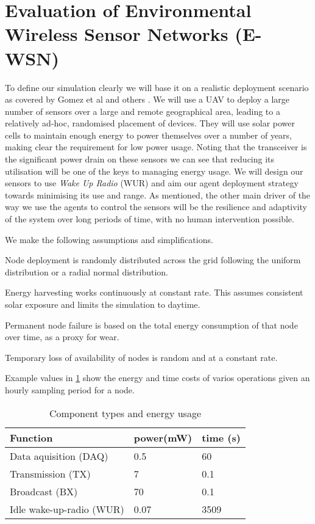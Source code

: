 \section{Evaluation of Environmental Wireless Sensor Networks (E-WSN)}
\label{section:experimental}	

To define our simulation clearly we will base it on a realistic deployment scenario as covered by Gomez et al \cite{Gomez} and others \cite{Jha2016, Avram}. We will use a UAV to deploy a large number of sensors over a large and remote geographical area, leading to a relatively ad-hoc, randomised placement of devices. They will use solar power cells to maintain enough energy to power themselves over a number of years, making clear the requirement for low power usage. Noting that the transceiver is the significant power drain on these sensors we can see that reducing its utilisation will be one of the keys to managing energy usage. We will design our sensors to use \textit{Wake Up Radio} (WUR) and aim our agent deployment strategy towards minimising its use and range. As mentioned, the other main driver of the way we use the agents to control the sensors will be the resilience and adaptivity of the system over long periods of time, with no human intervention possible. 

We make the following assumptions and simplifications.
\begin{itemize}{
		\item Node deployment is randomly distributed across the grid following the uniform distribution or a radial normal distribution.
		\item Energy harvesting works continuously at constant rate. This assumes consistent solar exposure and limits the simulation to daytime.
		\item Permanent node failure is based on the total energy consumption of that node over time, as a proxy for wear.
		\item Temporary loss of availability of nodes is random and at a constant rate.
	}
\end{itemize}




Example values in \ref{table:components_energy_usage} show the energy and time costs of varios operations given an hourly sampling period for a node.


\begin{table}
	\begin{tabular}{p{}p{} p{} }
		\hline
		Function & power(mW) & time (s) \\
		\hline
		Data aquisition (DAQ) & 0.5 & 60 \\
		Transmission (TX) & 7 & 0.1 \\
		Broadcast (BX) & 70 & 0.1 \\
		Idle wake-up-radio (WUR) & 0.07 & 3509 \\
	\end{tabular}
	\caption{Component types and energy usage}
	\label{table:components_energy_usage}
\end{table}

